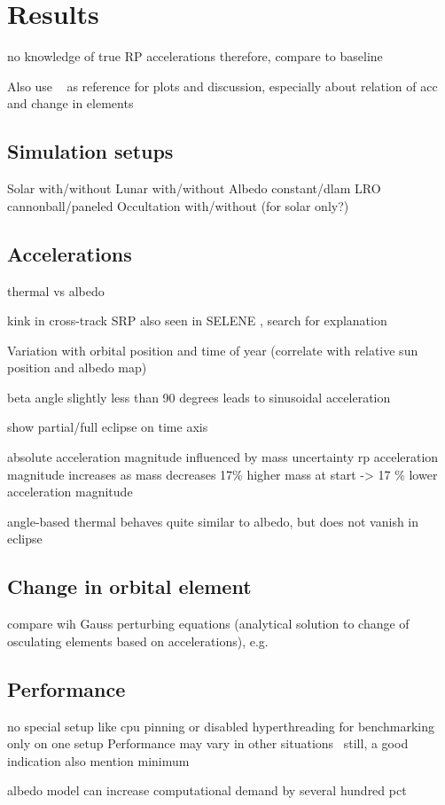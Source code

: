 \section{Results}

no knowledge of true RP accelerations
therefore, compare to baseline

Also use ~\cite{Borderies1990} as reference for plots and discussion, especially about relation of acc and change in elements

\subsection{Simulation setups}

Solar with/without
Lunar with/without
Albedo constant/dlam
LRO cannonball/paneled
Occultation with/without (for solar only?)


\subsection{Accelerations}
thermal vs albedo

kink in cross-track SRP also seen in SELENE \cite{Kubooka1999}, search for explanation

Variation with orbital position and time of year (correlate with relative sun position and albedo map)

beta angle slightly less than 90 degrees leads to sinusoidal acceleration

show partial/full eclipse on time axis

absolute acceleration magnitude influenced by mass uncertainty
rp acceleration magnitude increases as mass decreases
17\% higher mass at start -> 17 \% lower acceleration magnitude

angle-based thermal behaves quite similar to albedo, but does not vanish in eclipse



\subsection{Change in orbital element}

compare wih Gauss perturbing equations (analytical solution to change of osculating elements based on accelerations), e.g. ~\cite[Sec.~3.2]{Lucchesi2006}


\subsection{Performance}
no special setup like cpu pinning or disabled hyperthreading for benchmarking
only on one setup
Performance may vary in other situations~\cite{Mytkowicz2009}
still, a good indication
also mention minimum

albedo model can increase computational demand by several hundred pct \cite{Nicholson2010}

